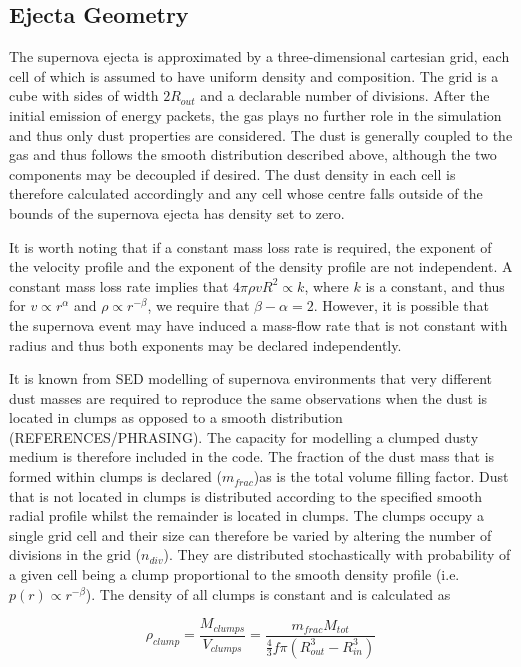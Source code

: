 \documentclass[useAMS,usenatbib]{mn2e}
\begin{document}
\subsection{Ejecta Geometry}
\label{grid}
The supernova ejecta is approximated by a three-dimensional cartesian grid, each cell of which is assumed to have uniform density and composition.  The grid is a cube with  sides of width $2R_{out}$ and a declarable number of divisions.  After the initial emission of energy packets, the gas plays no further role in the simulation and thus only dust properties are considered.  The dust is generally coupled to the gas and thus follows the smooth distribution described above, although the two components may be decoupled if desired.  The dust density in each cell is therefore calculated accordingly and any cell whose centre falls outside of the bounds of the supernova ejecta has density set to zero.  

It is worth noting that if a constant mass loss rate is required, the exponent of the velocity profile and the exponent of the density profile are not independent.  A constant mass loss rate implies that $4\pi \rho vR^2  \propto k$, where $k$ is a constant, and thus for $v \propto r^\alpha$ and $\rho\propto r^{-\beta}$, we require that $\beta-\alpha=2$.  However,  it is possible that the supernova event may have induced a mass-flow rate that is not constant with radius and thus both exponents may be declared independently.


It is known from SED modelling of supernova environments that very different dust masses are required to reproduce the same observations when the dust is located in clumps as opposed to a smooth distribution (REFERENCES/PHRASING).  The capacity for modelling a clumped dusty medium is therefore included in the code.  The fraction of the dust mass that is formed within clumps is declared ($m_{frac}$)as is the total volume filling factor.  Dust that is not located in clumps is distributed according to the specified smooth radial profile whilst the remainder is located in clumps.  The clumps occupy  a single grid cell and their size can therefore be varied by altering the number of divisions in the grid ($n_{div}$).  They are distributed stochastically with probability of a given cell being a clump proportional to the smooth density profile (i.e. $p(r) \propto r^{-\beta}$).  The density of all clumps is constant and is calculated as 

\begin{equation}
\rho_{clump}=\frac{M_{clumps}}{V_{clumps}}=\frac{m_{frac}M_{tot}}{\frac{4}{3} f\pi (R_{out}^{3}-R_{in}^{3} )}
\end{equation}
\end{document}
